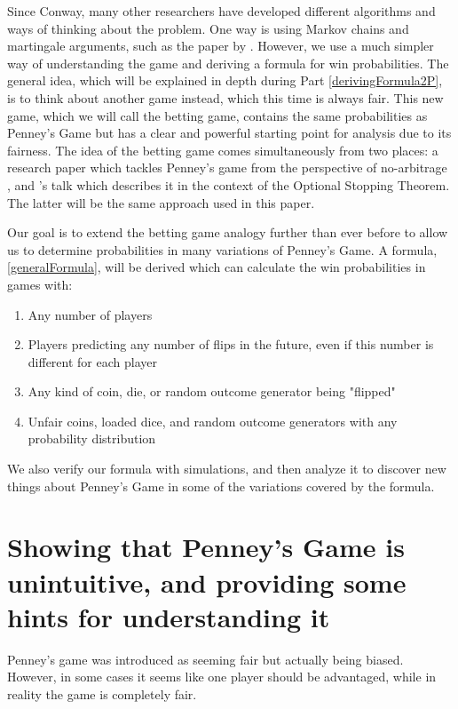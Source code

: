 \documentclass[english,12pt,a4paper,final]{article}
\begin{document}
Since Conway, many other researchers have developed different algorithms and ways of thinking about the problem. One way is using Markov chains and martingale arguments, such as the paper by \textcite{markov}. However, we use a much simpler way of understanding the game and deriving a formula for win probabilities. The general idea, which will be explained in depth during Part \ref{derivingFormula2P}, is to think about another game instead, which this time is always fair. This new game, which we will call the betting game, contains the same probabilities as Penney's Game but has a clear and powerful starting point for analysis due to its fairness. The idea of the betting game comes simultaneously from two places: a research paper which tackles Penney's game from the perspective of no-arbitrage \parencite{miller}, and \textcite{chung}'s talk which describes it in the context of the Optional Stopping Theorem. The latter will be the same approach used in this paper.

Our goal is to extend the betting game analogy further than ever before to allow us to determine probabilities in many variations of Penney's Game. A formula, \eqref{generalFormula}, will be derived which can calculate the win probabilities in games with:

\begin{enumerate}
	\item Any number of players
	\item Players predicting any number of flips in the future, even if this number is different for each player
	\item Any kind of coin, die, or random outcome generator being "flipped"
	\item Unfair coins, loaded dice, and random outcome generators with any probability distribution
\end{enumerate}

We also verify our formula with simulations, and then analyze it to discover new things about Penney's Game in some of the variations covered by the formula.

\part{Showing that Penney's Game is unintuitive, and providing some hints for understanding it}

Penney's game was introduced as seeming fair but actually being biased. However, in some cases it seems like one player should be advantaged, while in reality the game is completely fair.
\end{document}
